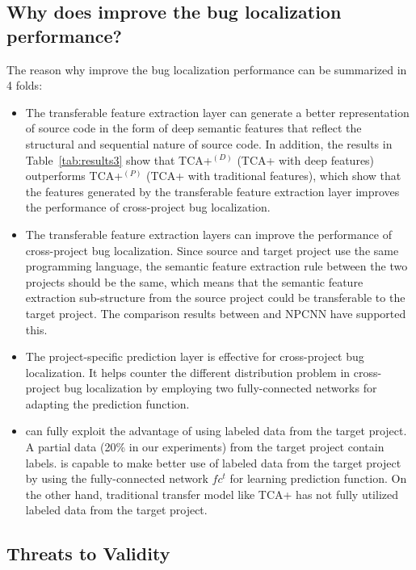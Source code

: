 \subsection{Why does \TRANPCNN improve the bug localization performance?}
The reason why \TRANPCNN improve the bug localization performance can be summarized in 4 folds:
\begin{itemize}
\item The transferable feature extraction layer can generate a better representation of source code in the form of deep semantic features that reflect the structural and sequential nature of source code. In addition, the results in Table~\ref{tab:results3} show that TCA+$^{(D)}$ (TCA+ with deep features) outperforms TCA+$^{(P)}$ (TCA+ with traditional features), which show that the features generated by the transferable feature extraction layer improves the performance of cross-project bug localization. 
\item The transferable feature extraction layers can improve the performance of cross-project bug localization. Since source and target project use the same programming language, the semantic feature extraction rule between the two projects should be the same, which means that the semantic feature extraction sub-structure from the source project could be transferable to the target project. The comparison results between \TRANPCNN and NPCNN have supported this. 
\item The project-specific prediction layer is effective for cross-project bug localization. It helps counter the different distribution problem in cross-project bug localization by employing two fully-connected networks for adapting the prediction function.
\item \TRANPCNN can fully exploit the advantage of using labeled data from the target project. A partial data (20\% in our experiments) from the target project contain labels. \TRANPCNN is capable to make better use of labeled data from the target project by using the fully-connected network $fc^t$ for learning prediction function. On the other hand, traditional transfer model like TCA+ has not fully utilized labeled data from the target project. 
\end{itemize}



\subsection{Threats to Validity}

